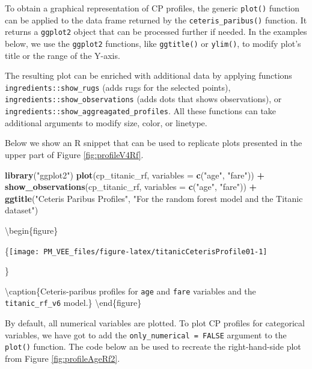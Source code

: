 \documentclass[12pt,]{krantz}
\newenvironment{Shaded}{\begin{snugshade}}{\end{snugshade}}
\newcommand{\DataTypeTok}[1]{\textcolor[rgb]{0.13,0.29,0.53}{#1}}
\newcommand{\KeywordTok}[1]{\textcolor[rgb]{0.13,0.29,0.53}{\textbf{#1}}}
\newcommand{\NormalTok}[1]{#1}
\newcommand{\OperatorTok}[1]{\textcolor[rgb]{0.81,0.36,0.00}{\textbf{#1}}}
\newcommand{\StringTok}[1]{\textcolor[rgb]{0.31,0.60,0.02}{#1}}
\begin{document}
To obtain a graphical representation of CP profiles, the generic \texttt{plot()} function can be applied to the data frame returned by the \texttt{ceteris\_paribus()} function. It returns a \texttt{ggplot2} object that can be processed further if needed. In the examples below, we use the \texttt{ggplot2} functions, like \texttt{ggtitle()} or \texttt{ylim()}, to modify plot's title or the range of the Y-axis.

The resulting plot can be enriched with additional data by applying functions \texttt{ingredients::show\_rugs} (adds rugs for the selected points), \texttt{ingredients::show\_observations} (adds dots that shows observations), or \texttt{ingredients::show\_aggreagated\_profiles}. All these functions can take additional arguments to modify size, color, or linetype.

Below we show an R snippet that can be used to replicate plots presented in the upper part of Figure \ref{fig:profileV4Rf}.

\begin{Shaded}
\begin{Highlighting}[]
\KeywordTok{library}\NormalTok{(}\StringTok{"ggplot2"}\NormalTok{)}
\KeywordTok{plot}\NormalTok{(cp_titanic_rf, }\DataTypeTok{variables =} \KeywordTok{c}\NormalTok{(}\StringTok{"age"}\NormalTok{, }\StringTok{"fare"}\NormalTok{)) }\OperatorTok{+}
\StringTok{  }\KeywordTok{show_observations}\NormalTok{(cp_titanic_rf, }\DataTypeTok{variables =} \KeywordTok{c}\NormalTok{(}\StringTok{"age"}\NormalTok{, }\StringTok{"fare"}\NormalTok{)) }\OperatorTok{+}
\StringTok{  }\KeywordTok{ggtitle}\NormalTok{(}\StringTok{"Ceteris Paribus Profiles"}\NormalTok{, }\StringTok{"For the random forest model and the Titanic dataset"}\NormalTok{)}
\end{Highlighting}
\end{Shaded}

\textbackslash{}begin\{figure\}

\{\centering \texttt{[image: PM\_VEE\_files/figure-latex/titanicCeterisProfile01-1]}

\}

\textbackslash{}caption\{Ceteris-paribus profiles for \texttt{age} and \texttt{fare} variables and the \texttt{titanic\_rf\_v6} model.\}\label{fig:titanicCeterisProfile01}
\textbackslash{}end\{figure\}

By default, all numerical variables are plotted.
To plot CP profiles for categorical variables, we have got to add the \texttt{only\_numerical\ =\ FALSE} argument to the \texttt{plot()} function. The code below an be used to recreate the right-hand-side plot from Figure \ref{fig:profileAgeRf2}.
\end{document}
